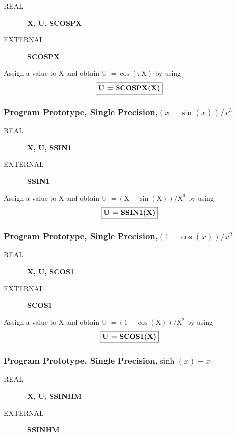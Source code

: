\documentclass[twoside]{MATH77}
\begin{document}
\begin{description}

\item[REAL] \ {\bf  X, U, SCOSPX}

\item[EXTERNAL] \ {\bf  SCOSPX}

\end{description}

Assign a value to X and obtain U $= \cos (\pi \text{X})$ by using
$$
\fbox{\bf U = SCOSPX(X)}
$$
\subsubsection{Program Prototype, Single Precision,\newline  $(x-\sin (x))/x^3$}

\begin{description}

\item[REAL] \ {\bf  X, U, SSIN1}

\item[EXTERNAL] \ {\bf  SSIN1}

\end{description}

Assign a value to X and obtain U $= (\text{X}-\sin (\text{X}))/\text{X}^3$ by using
$$
\fbox{\bf U = SSIN1(X)}
$$
\subsubsection{Program Prototype, Single Precision,\newline  $(1-\cos (x))/x^2$}

\begin{description}

\item[REAL] \ {\bf  X, U, SCOS1}

\item[EXTERNAL] \ {\bf  SCOS1}

\end{description}

Assign a value to X and obtain U $= (1-\cos (\text{X}))/\text{X}^2$ by using
$$
\fbox{\bf U = SCOS1(X)}
$$
\subsubsection{Program Prototype, Single Precision,\newline  $\sinh(x) - x$}

\begin{description}

\item[REAL] \ {\bf  X, U, SSINHM}

\item[EXTERNAL] \ {\bf  SSINHM}

\end{description}
\end{document}
